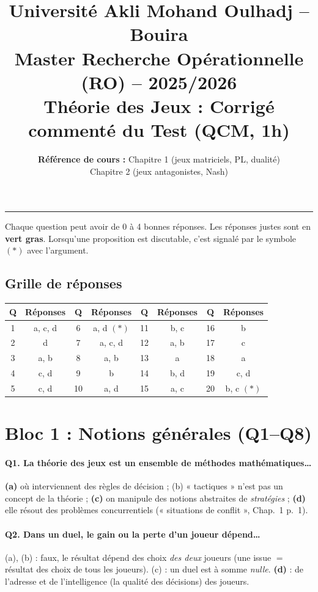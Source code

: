 \documentclass[11pt,a4paper]{article}
\title{\textbf{Université Akli Mohand Oulhadj -- Bouira}\\
\large Master Recherche Opérationnelle (RO) -- 2025/2026\\
\Large \textbf{Théorie des Jeux : Corrigé commenté du Test (QCM, 1h)}}
\author{\textbf{Référence de cours :} Chapitre 1 (jeux matriciels, PL, dualité)\\ Chapitre 2 (jeux antagonistes, Nash)}
\date{}
\newcommand{\bon}[1]{\textcolor{green!50!black}{\textbf{#1}}}
\newcommand{\faux}[1]{\textcolor{red!70!black}{#1}}
\begin{document}
\maketitle
\hrule
\vspace{0.3cm}

Chaque question peut avoir de 0 à 4 bonnes réponses. Les réponses justes sont en \bon{vert gras}. Lorsqu'une proposition est discutable, c'est signalé par le symbole $(\ast)$ avec l'argument.

\subsection*{Grille de réponses}
\begin{center}
\renewcommand{\arraystretch}{1.25}
\begin{tabular}{|c|c||c|c||c|c||c|c|}
\hline
Q & Réponses & Q & Réponses & Q & Réponses & Q & Réponses\\\hline
1 & a, c, d & 6 & a, d $(\ast)$ & 11 & b, c & 16 & b\\
2 & d & 7 & a, c, d & 12 & a, b & 17 & c\\
3 & a, b & 8 & a, b & 13 & a & 18 & a\\
4 & c, d & 9 & b & 14 & b, d & 19 & c, d\\
5 & c, d & 10 & a, d & 15 & a, c & 20 & b, c $(\ast)$\\\hline
\end{tabular}
\end{center}

\section*{Bloc 1 : Notions générales (Q1--Q8)}

\paragraph{Q1. La théorie des jeux est un ensemble de méthodes mathématiques\dots}
\bon{(a)} où interviennent des règles de décision ; \faux{(b)} « tactiques » n'est pas un concept de la théorie ; \bon{(c)} on manipule des notions abstraites de \emph{stratégies} ; \bon{(d)} elle résout des problèmes concurrentiels (« situations de conflit », Chap.~1 p.~1).

\paragraph{Q2. Dans un duel, le gain ou la perte d'un joueur dépend\dots}
\faux{(a)}, \faux{(b)} : faux, le résultat dépend des choix \emph{des deux} joueurs (une issue $=$ résultat des choix de tous les joueurs). \faux{(c)} : un duel est à somme \emph{nulle}. \bon{(d)} : de l'adresse et de l'intelligence (la qualité des décisions) des joueurs.
\end{document}
